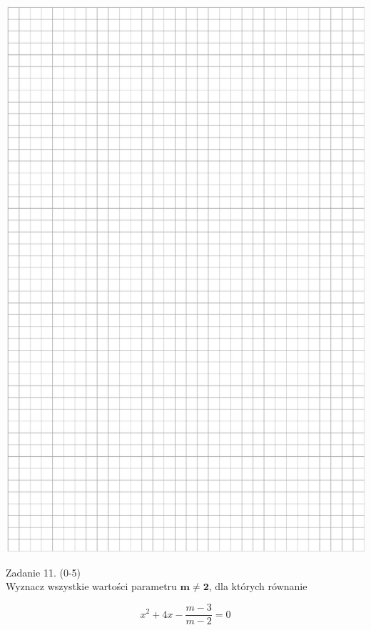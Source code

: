 \documentclass[10pt]{article}
\begin{document}
\begin{center}
\includegraphics[max width=\textwidth]{2024_11_21_f1ecc00f5c4ab21f0d04g-17}
\end{center}

Zadanie 11. (0-5)\\
Wyznacz wszystkie wartości parametru \(\boldsymbol{m} \neq \mathbf{2}\), dla których równanie

\[
x^{2}+4 x-\frac{m-3}{m-2}=0
\]
\end{document}
